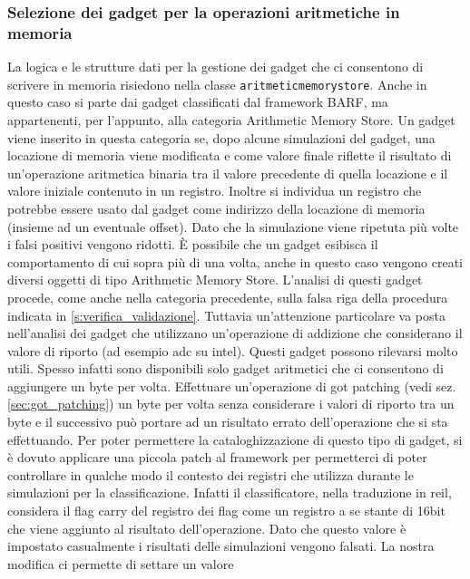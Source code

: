 \subsubsection{Selezione dei gadget per la operazioni aritmetiche in
  memoria}
\label{sec:arithmeticstore}

La logica e le strutture dati per la gestione dei gadget che ci
consentono di scrivere in memoria risiedono nella classe
\lstinline{aritmeticmemorystore}. Anche in questo caso si parte dai
gadget classificati dal framework BARF, ma appartenenti, per
l'appunto, alla categoria Arithmetic Memory Store. Un gadget viene
inserito in questa categoria se, dopo alcune simulazioni del gadget,
una locazione di memoria viene modificata e come valore finale
riflette il risultato di un'operazione aritmetica binaria tra il
valore precedente di quella locazione e il valore iniziale contenuto
in un registro. Inoltre si individua un registro che potrebbe essere
usato dal gadget come indirizzo della locazione di memoria (insieme ad
un eventuale offset). Dato che la simulazione viene ripetuta più volte
i falsi positivi vengono ridotti. È possibile che un gadget esibisca
il comportamento di cui sopra più di una volta, anche in questo caso
vengono creati diversi oggetti di tipo Arithmetic Memory
Store. L'analisi di questi gadget procede, come anche nella categoria
precedente, sulla falsa riga della procedura indicata in
\ref{s:verifica_validazione}. Tuttavia un'attenzione particolare va
posta nell'analisi dei gadget che utilizzano un'operazione di
addizione che considerano il valore di riporto (ad esempio adc su
intel). Questi gadget possono rilevarsi molto utili. Spesso infatti
sono disponibili solo gadget aritmetici che ci consentono di
aggiungere un byte per volta. Effettuare un'operazione di got patching
(vedi sez. \ref{sec:got_patching}) un byte per volta senza considerare
i valori di riporto tra un byte e il successivo può portare ad un
risultato errato dell'operazione che si sta effettuando. Per poter
permettere la cataloghizzazione di questo tipo di gadget, si è dovuto
applicare una piccola patch al framework per permetterci di poter
controllare in qualche modo il contesto dei registri che utilizza
durante le simulazioni per la classificazione. Infatti il
classificatore, nella traduzione in reil, considera il flag carry del
registro dei flag come un registro a se stante di 16bit che viene
aggiunto al risultato dell'operazione. Dato che questo valore è
impostato casualmente i risultati delle simulazioni vengono
falsati. La nostra modifica ci permette di settare un valore
